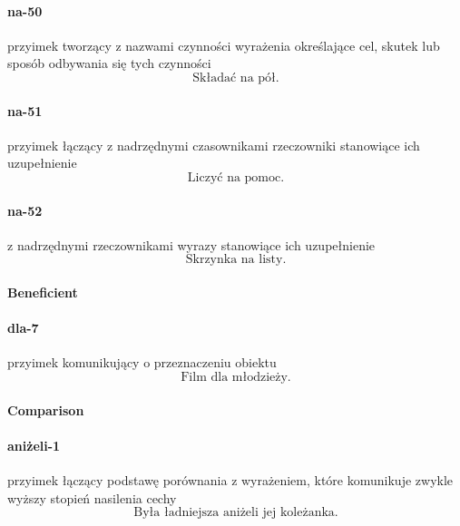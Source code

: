 \documentclass[a4paper, 12pt]{article}
\theoremstyle{remark}
\begin{document}
\paragraph{na-50}\label{prep-50}	przyimek tworzący z nazwami czynności wyrażenia określające cel, skutek lub sposób odbywania się tych czynności
\begin{equation}
\text{Składać na pół.}
\end{equation}
\paragraph{na-51}\label{prep-51}	przyimek łączący z nadrzędnymi czasownikami rzeczowniki stanowiące ich uzupełnienie
\begin{equation}
\text{Liczyć na pomoc.}
\end{equation}
\paragraph{na-52}\label{prep-52}	z nadrzędnymi rzeczownikami wyrazy stanowiące ich uzupełnienie
\begin{equation}
\text{Skrzynka na listy.}
\end{equation}
\paragraph{Beneficient} %
\label{sub:beneficient}
\paragraph{dla-7} \label{prep-7}	przyimek komunikujący o przeznaczeniu obiektu
\begin{equation}
\text{Film dla młodzieży.}
\end{equation}
\paragraph{Comparison} %
\label{sub:comparison}
\paragraph{aniżeli-1} \label{prep-1}	przyimek łączący podstawę porównania z wyrażeniem, które komunikuje zwykle wyższy stopień nasilenia cechy
\begin{equation}
\text{Była ładniejsza aniżeli jej koleżanka.}
\end{equation}
\end{document}
